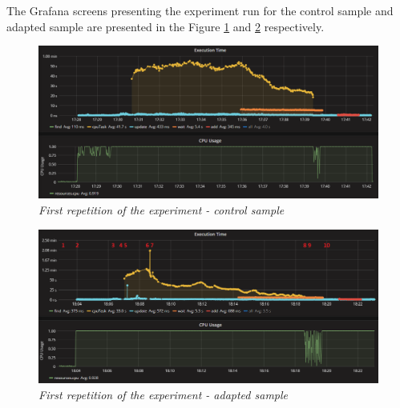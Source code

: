 \documentclass[12pt,a4paper]{article}
\begin{document}
The Grafana screens presenting the experiment run for the control sample and adapted sample are presented in the Figure \ref{figure:random:screen:control:1} and \ref{figure:random:screen:adapted:1} respectively. 

\begin{figure}[!htb]
\centering
\includegraphics[width=1\textwidth]{1-ctrl}
\caption{\textit{First repetition of the experiment - control sample}} \label{figure:random:screen:control:1}
\end{figure}

\begin{figure}[!htb]
\centering
\includegraphics[width=1\textwidth]{1-adap}
\caption{\textit{First repetition of the experiment - adapted sample}} \label{figure:random:screen:adapted:1}
\end{figure}
\end{document}
